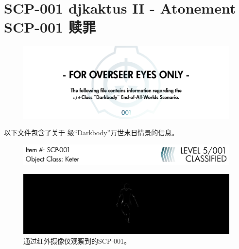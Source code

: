 \chapter[SCP-001 赎罪]{
    SCP-001 djkaktus II - Atonement\\
    SCP-001 赎罪
}

\label{chap:SCP-001.atonement}

\begin{center}

\begin{figure}[H]
    \centering
    \includegraphics[width=\linewidth]{images/SCP-001-atonement.png}
\end{figure}


以下文件包含了关于
级“Darkbody”万世末日情景的信息。



\end{center}

\newpage

\begin{figure}[H]
    \centering
    \includegraphics[width=\linewidth]{images/SCP-001-atonement-2.png}
\end{figure}

\begin{figure}[H]
    \centering
    \includegraphics[width=\linewidth]{images/SCP-001-atonement-3.jpg}
    \caption*{通过红外摄像仪观察到的SCP-001。}
\end{figure}


